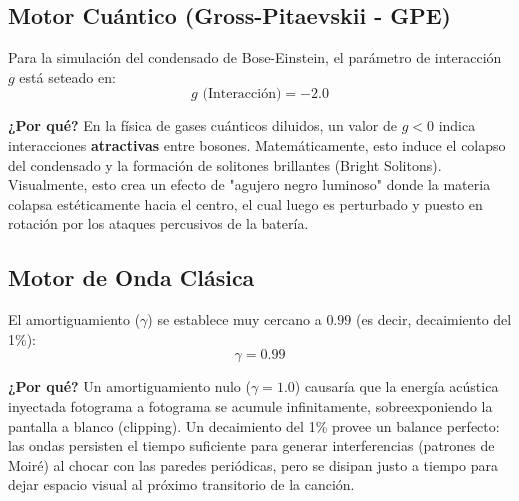 \documentclass[12pt]{article}
\begin{document}
\subsection{Motor Cuántico (Gross-Pitaevskii - GPE)}
Para la simulación del condensado de Bose-Einstein, el parámetro de interacción $g$ está seteado en:
\begin{equation}
g \text{ (Interacción)} = -2.0
\end{equation}

\textbf{¿Por qué?} En la física de gases cuánticos diluidos, un valor de $g < 0$ indica interacciones \textbf{atractivas} entre bosones. Matemáticamente, esto induce el colapso del condensado y la formación de solitones brillantes (Bright Solitons). Visualmente, esto crea un efecto de "agujero negro luminoso" donde la materia colapsa estéticamente hacia el centro, el cual luego es perturbado y puesto en rotación por los ataques percusivos de la batería.

\subsection{Motor de Onda Clásica}
El amortiguamiento ($\gamma$) se establece muy cercano a $0.99$ (es decir, decaimiento del 1\%):
\begin{equation}
\gamma = 0.99
\end{equation}

\textbf{¿Por qué?} Un amortiguamiento nulo ($\gamma = 1.0$) causaría que la energía acústica inyectada fotograma a fotograma se acumule infinitamente, sobreexponiendo la pantalla a blanco (clipping). Un decaimiento del 1\% provee un balance perfecto: las ondas persisten el tiempo suficiente para generar interferencias (patrones de Moiré) al chocar con las paredes periódicas, pero se disipan justo a tiempo para dejar espacio visual al próximo transitorio de la canción.
\end{document}
